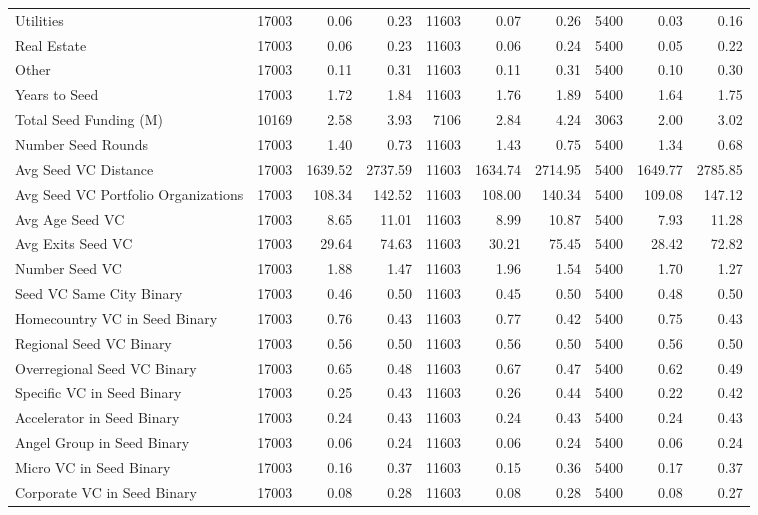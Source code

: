 {\begin{table}[!h]
{\begin{tabular}[t]{lrrrrrrrrr}
Utilities & 17003 & 0.06 & 0.23 & 11603 & 0.07 & 0.26 & 5400 & 0.03 & 0.16\\
Real Estate & 17003 & 0.06 & 0.23 & 11603 & 0.06 & 0.24 & 5400 & 0.05 & 0.22\\
Other & 17003 & 0.11 & 0.31 & 11603 & 0.11 & 0.31 & 5400 & 0.10 & 0.30\\
Years to Seed & 17003 & 1.72 & 1.84 & 11603 & 1.76 & 1.89 & 5400 & 1.64 & 1.75\\
\addlinespace
Total Seed Funding (M) & 10169 & 2.58 & 3.93 & 7106 & 2.84 & 4.24 & 3063 & 2.00 & 3.02\\
Number Seed Rounds & 17003 & 1.40 & 0.73 & 11603 & 1.43 & 0.75 & 5400 & 1.34 & 0.68\\
Avg Seed VC Distance & 17003 & 1639.52 & 2737.59 & 11603 & 1634.74 & 2714.95 & 5400 & 1649.77 & 2785.85\\
Avg Seed VC Portfolio Organizations & 17003 & 108.34 & 142.52 & 11603 & 108.00 & 140.34 & 5400 & 109.08 & 147.12\\
Avg Age Seed VC & 17003 & 8.65 & 11.01 & 11603 & 8.99 & 10.87 & 5400 & 7.93 & 11.28\\
\addlinespace
Avg Exits Seed VC & 17003 & 29.64 & 74.63 & 11603 & 30.21 & 75.45 & 5400 & 28.42 & 72.82\\
Number Seed VC & 17003 & 1.88 & 1.47 & 11603 & 1.96 & 1.54 & 5400 & 1.70 & 1.27\\
Seed VC Same City Binary & 17003 & 0.46 & 0.50 & 11603 & 0.45 & 0.50 & 5400 & 0.48 & 0.50\\
Homecountry VC in Seed Binary & 17003 & 0.76 & 0.43 & 11603 & 0.77 & 0.42 & 5400 & 0.75 & 0.43\\
Regional Seed VC Binary & 17003 & 0.56 & 0.50 & 11603 & 0.56 & 0.50 & 5400 & 0.56 & 0.50\\
\addlinespace
Overregional Seed VC Binary & 17003 & 0.65 & 0.48 & 11603 & 0.67 & 0.47 & 5400 & 0.62 & 0.49\\
Specific VC in Seed Binary & 17003 & 0.25 & 0.43 & 11603 & 0.26 & 0.44 & 5400 & 0.22 & 0.42\\
Accelerator in Seed Binary & 17003 & 0.24 & 0.43 & 11603 & 0.24 & 0.43 & 5400 & 0.24 & 0.43\\
Angel Group in Seed Binary & 17003 & 0.06 & 0.24 & 11603 & 0.06 & 0.24 & 5400 & 0.06 & 0.24\\
Micro VC in Seed Binary & 17003 & 0.16 & 0.37 & 11603 & 0.15 & 0.36 & 5400 & 0.17 & 0.37\\
\addlinespace
Corporate VC in Seed Binary & 17003 & 0.08 & 0.28 & 11603 & 0.08 & 0.28 & 5400 & 0.08 & 0.27\\

\end{tabular}}
\end{table}}
